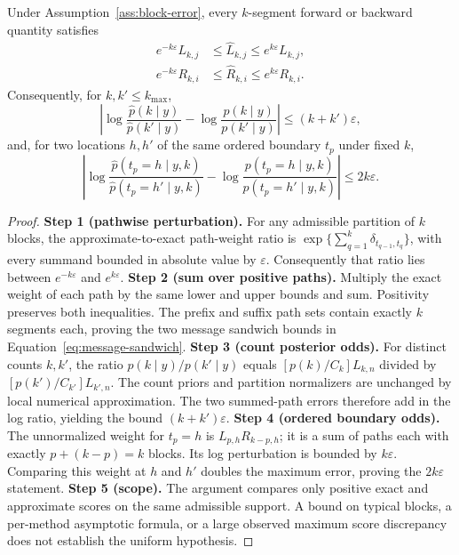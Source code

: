 \begin{theorem}
\label{thm:stability-paper}
Under Assumption~\ref{ass:block-error}, every $k$-segment forward or backward quantity satisfies
\begin{align}
e^{-k\varepsilon}L_{k,j}
&\le\widehat L_{k,j}\le e^{k\varepsilon}L_{k,j},\nonumber\\
e^{-k\varepsilon}R_{k,i}
&\le\widehat R_{k,i}\le e^{k\varepsilon}R_{k,i}.
\label{eq:message-sandwich}
\end{align}
Consequently, for $k,k'\le k_{\max}$,
\begin{equation}
\left|
\log\frac{\widehat p(k\mid y)}{\widehat p(k'\mid y)}
-\log\frac{p(k\mid y)}{p(k'\mid y)}
\right|\le(k+k')\varepsilon,
\label{eq:k-odds-stability}
\end{equation}
and, for two locations $h,h'$ of the same ordered boundary $t_p$ under fixed $k$,
\begin{equation}
\left|
\log\frac{\widehat p(t_p=h\mid y,k)}{\widehat p(t_p=h'\mid y,k)}
-\log\frac{p(t_p=h\mid y,k)}{p(t_p=h'\mid y,k)}
\right|\le2k\varepsilon.
\label{eq:boundary-odds-stability}
\end{equation}
\end{theorem}
\begin{proof}
\textbf{Step 1 (pathwise perturbation).}
For any admissible partition of $k$ blocks, the approximate-to-exact path-weight ratio is $\exp\{\sum_{q=1}^k\delta_{t_{q-1},t_q}\}$, with every summand bounded in absolute value by $\varepsilon$. Consequently that ratio lies between $e^{-k\varepsilon}$ and $e^{k\varepsilon}$.
\textbf{Step 2 (sum over positive paths).}
Multiply the exact weight of each path by the same lower and upper bounds and sum. Positivity preserves both inequalities. The prefix and suffix path sets contain exactly $k$ segments each, proving the two message sandwich bounds in Equation~\eqref{eq:message-sandwich}.
\textbf{Step 3 (count posterior odds).}
For distinct counts $k,k'$, the ratio $p(k\mid y)/p(k'\mid y)$ equals $[p(k)/C_k]L_{k,n}$ divided by $[p(k')/C_{k'}]L_{k',n}$. The count priors and partition normalizers are unchanged by local numerical approximation. The two summed-path errors therefore add in the log ratio, yielding the bound $(k+k')\varepsilon$.
\textbf{Step 4 (ordered boundary odds).}
The unnormalized weight for $t_p=h$ is $L_{p,h}R_{k-p,h}$; it is a sum of paths each with exactly $p+(k-p)=k$ blocks. Its log perturbation is bounded by $k\varepsilon$. Comparing this weight at $h$ and $h'$ doubles the maximum error, proving the $2k\varepsilon$ statement.
\textbf{Step 5 (scope).}
The argument compares only positive exact and approximate scores on the same admissible support. A bound on typical blocks, a per-method asymptotic formula, or a large observed maximum score discrepancy does not establish the uniform hypothesis.
\end{proof}

